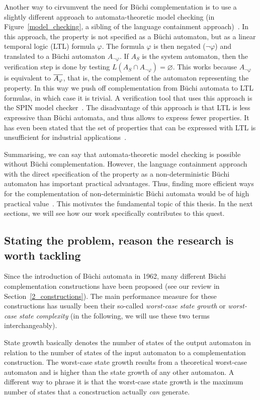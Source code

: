 Another way to cirvumvent the need for Büchi complementation is to use a slightly different approach to automata-theoretic model checking (in Figure~\ref{model_checking}, a sibling of the language containment approach)~\cite{2007_vardi_model_checking}. In this approach, the property is not specified as a Büchi automaton, but as a linear temporal logic (LTL) formula $\varphi$. The formula $\varphi$ is then negated ($\neg\varphi$) and translated to a Büchi automaton $A_{\neg\varphi}$. If $A_S$ is the system automaton, then the verification step is done by testing $L(A_S \cap A_{\neg\varphi}) = \varnothing$. This works because $A_{\neg\varphi}$ is equivalent to $\cl1{A_{\varphi}}$, that is, the complement of the automaton representing the property. In this way we push off complementation from Büchi automata to LTL formulas, in which case it is trivial. A verification tool that uses this approach is the SPIN model checker~\cite{1997_spin}. The disadvantage of this approach is that LTL is less expressive than Büchi automata, and thus allows to express fewer properties. It has even been stated that the set of properties that can be expressed with LTL is unsufficient for industrial applications~\cite{2007_vardi_model_checking}.

Summarising, we can say that automata-theoretic model checking is possible without Büchi complementation. However, the language containment approach with the direct specification of the property as a non-deterministic Büchi automaton has important practical advantages. Thus, finding more efficient ways for the complementation of non-deterministic Büchi automata would be of high practical value~\cite{2007_vardi_model_checking}. This motivates the fundamental topic of this thesis. In the next sections, we will see how our work specifically contributes to this quest.


\subsection{Stating the problem, reason the research is worth tackling}
Since the introduction of Büchi automata in 1962, many different Büchi complementation constructions have been proposed (see our review in Section~\ref{2_constructions}). The main performance measure for these constructions has usually been their so-called \textit{worst-case state growth} or \textit{worst-case state complexity} (in the following, we will use these two terms interchangeably).

State growth basically denotes the number of states of the output automaton in relation to the number of states of the input automaton to a complementation construction. The worst-case state growth results from a theoretical worst-case automaton and is higher than the state growth of any other automaton. A different way to phrase it is that the worst-case state growth is the maximum number of states that a concstruction actually \textit{can} generate.

